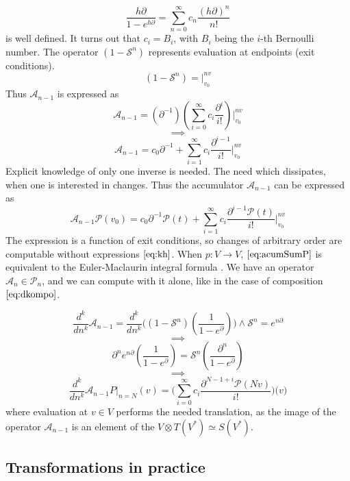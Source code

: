 \documentclass{article}
\newcommand{\Shift}{\mathcal{S}}
\newcommand{\dP}{\mathcal{P}}
\newcommand{\D}{\partial}
\begin{document}
    \begin{equation}
    	\frac{h\D}{1-e^{h\D}}=\sum\limits_{n=0}^{\infty}c_n\frac{(h\D)^n}{n!}
    \end{equation}
    is well defined. It turns out that $c_i=B_i$, with $B_i$ being the $i$-th Bernoulli number. The operator $(1-\Shift^n)$ represents evaluation at endpoints (exit conditions).
    $$(1-\Shift^n)=\Bigg\vert_{v_0}^{nv}$$
    Thus $\mathcal{A}_{n-1}$ is expressed as
    $$\mathcal{A}_{n-1}=(\D^{-1})(\sum\limits_{i=0}^{\infty}c_i\frac{\D^i}{i!})\Bigg\vert_{v_0}^{nv}$$
    $$\implies$$
    \begin{equation}\label{eq:acumSum}
    \mathcal{A}_{n-1}=c_0\D^{-1}+\sum\limits_{i=1}^{\infty}c_i\frac{\D^{i-1}}{i!}\Bigg\vert_{v_0}^{nv}
    \end{equation}
    Explicit knowledge of only one inverse is needed. The need which dissipates, when one is interested in changes. Thus the accumulator  $\mathcal{A}_{n-1}$ can be expressed as
    \begin{equation}\label{eq:acumSumP}
    	\mathcal{A}_{n-1}\dP(v_0)=c_0\D^{-1}\dP(t)+\sum\limits_{i=1}^{\infty}c_i\frac{\D^{i-1}\dP(t)}{i!}\Bigg\vert_{v_0}^{nv}
    \end{equation}
    The expression is a function of exit conditions, so changes of arbitrary order are computable without expressions $\eqref{eq:kh}$. When $p:V\to V$, $\eqref{eq:acumSumP}$ is equivalent to the Euler-Maclaurin integral formula \cite{EulerSumAbramowitzStegun}.  We have an operator $\mathcal{A}_n\in\dP_n$, and we can compute with it alone, like in the case of composition $\eqref{eq:dkompo}$.

    $$\frac{d^k}{dn^k}\mathcal{A}_{n-1}=\frac{d^k}{dn^k}\Big((1-\Shift^n)(\frac{1}{1-e^\D})\Big)\land \Shift^n=e^{n\D}$$
        $$\implies$$
        $$\D^n e^{n\D}(\frac{1}{1-e^\D}) = \Shift^n(\frac{\D^n}{1-e^\D})$$
        $$\implies$$
        \begin{equation}
        \frac{d^k}{dn^k}\mathcal{A}_{n-1}P\vert_{n=N}(v)=\Big(\sum\limits_{i=0}^{\infty}c_i\frac{\D^{N-1+i}\dP(Nv)}{i!}\Big)\Big(v\Big)
        \end{equation}
        where evaluation at $v\in V$ performs the needed translation, as the image of the operator $\mathcal{A}_{n-1}$ is an element of the $V\otimes T(V^*)\simeq S(V^*)$.

\subsection{Transformations in practice} 
\end{document}

